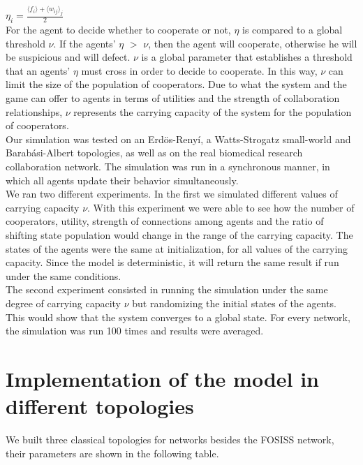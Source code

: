 \documentclass{bmcart}
\begin{document}
$\eta_i = \frac{\langle f_i \rangle + \langle w_{ij} \rangle _j}{2}$\\

 For the agent to decide whether to cooperate or not, $\eta$ is
  compared to a global threshold $\nu$. If the agents' $\eta$ $>$ $\nu$,
  then the agent will cooperate, otherwise he will be suspicious and will
  defect. $\nu$ is a global parameter that establishes a threshold that an
  agents' $\eta$ must cross in order to decide to cooperate. In this way,
  $\nu$ can limit the size of the population of cooperators. Due
  to what the system and the game can offer to agents in terms of utilities and the strength
  of collaboration relationships, $\nu$ represents the carrying capacity of the
  system for the population of cooperators.\\


Our simulation was tested on an Erd\"{o}s-Reny\'i, a
Watts-Strogatz small-world and Barab\'asi-Albert topologies, as well
as on the real biomedical research collaboration network. The
simulation was run in a synchronous manner, in which all agents update their
behavior simultaneously. \\   

We ran two different experiments. In the first we simulated different
values of carrying capacity $\nu$. With this experiment we were able
to see how the number of cooperators, utility, strength of connections
among agents and the ratio of shifting state population would change
in the range of the carrying capacity. The states of the agents were
the same at initialization, for all values of the carrying
capacity. Since the model is deterministic, it will return the same
result if run under the same conditions.\\

The second experiment consisted in running the simulation under the
same degree of carrying capacity $\nu$ but randomizing the initial
states of the agents. This would show that the system converges to a
global state. For every network, the simulation was run 100 times and
results were averaged.

\section*{Implementation of the model in different topologies}

We built three classical topologies for networks besides the FOSISS network, their parameters are shown in the following table.\\
\end{document}
